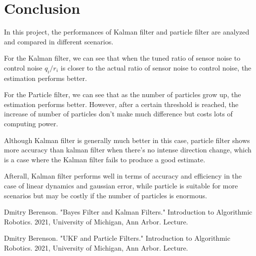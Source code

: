 \documentclass[letterpaper,11pt]{article}
\begin{document}
\section{Conclusion}
In this project, the performances of Kalman filter and particle filter are analyzed and compared in different scenarios.

For the Kalman filter, we can see that when the tuned ratio of sensor noise to control noise $q_i / r_i$ is closer to the actual ratio of sensor noise to control noise, the estimation performs better.

For the Particle filter, we can see that as the number of particles grow up, the estimation performs better. However, after a certain threshold is reached, the increase of number of particles don't make much difference but costs lots of computing power.

Although Kalman filter is generally much better in this case, particle filter shows more accuracy than kalman filter when there's no intense direction change, which is a case where the Kalman filter fails to produce a good estimate.

Afterall, Kalman filter performs well in terms of accuracy and efficiency in the case of linear dynamics and gaussian error, while particle is suitable for more scenarios but may be costly if the number of particles is enormous.



\begin{thebibliography}{99}

Dmitry Berenson. "Bayes Filter and Kalman Filters." Introduction to Algorithmic Robotics. 2021, University of Michigan, Ann Arbor. Lecture.

Dmitry Berenson. "UKF and Particle Filters." Introduction to Algorithmic Robotics. 2021, University of Michigan, Ann Arbor. Lecture.


\end{thebibliography}


\end{document}

